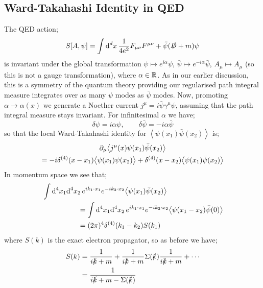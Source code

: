 \subsection{Ward-Takahashi Identity in QED}
The QED action;
\begin{equation*}
S[A, \psi] = \int{\text{d}^d x \,\frac{1}{4e^2}F_{\mu\nu}F^{\mu\nu} + \bar{\psi}(\slashed{D} + m)\psi}
\end{equation*}
is invariant under the global transformation $\psi \mapsto e^{i\alpha}\psi$, $\bar{\psi} \mapsto e^{-i\alpha}\bar{\psi}$, $A_\mu \mapsto A_\mu$ (so this is not a gauge transformation), where $\alpha \in \mathbb{R}$. As in our earlier discussion, this is a symmetry of the quantum theory providing our regularised path integral measure integrates over as many $\psi$ modes as $\bar{\psi}$ modes. Now, promoting $\alpha \rightarrow \alpha(x)$ we generate a Noether current $j^{\mu} = i \bar{\psi}\gamma^{\mu}\psi$, assuming that the path integral measure stays invariant. For infinitesimal $\alpha$ we have;
\begin{equation*}
\delta \psi = i \alpha \psi, \qquad \delta \bar{\psi} = -i \alpha \bar{\psi}
\end{equation*}
so that the local Ward-Takahashi identity for $\left< \psi(x_1)\bar{\psi}(x_2) \right>$ is;
\begin{multline*}
\del_\mu\left< j^{\mu}(x)\psi(x_1)\bar{\psi}(x_2) \right> \\ = -i\delta^{(4)}(x - x_1)\left< \psi(x_1)\bar{\psi}(x_2) \right> + \delta^{(4)}(x - x_2)\left< \psi(x_1)\bar{\psi}(x_2) \right>
\end{multline*}
In momentum space we see that;
\begin{align*}
&\int{\ud^4 x_1\upd{^4 x_2}e^{ik_1 \cdot x_1}e^{-ik_2\cdot x_2}\left< \psi(x_1)\bar{\psi}(x_2) \right>} \\
&\hspace{50pt}= \int{\ud^4 x_1 \upd{^4 x_2} e^{ik_1\cdot x_1}e^{-ik_2\cdot x_2}\left< \psi(x_1 - x_2)\bar{\psi}(0) \right>} \\
&\hspace{50pt}= (2\pi)^4 \delta^{(4)}(k_1 - k_2)S(k_1)
\end{align*}
where $S(k)$ is the exact electron propagator, so as before we have;
\begin{align*}
S(k) &= \frac{1}{i\slashed{k} + m} + \frac{1}{i\slashed{k} + m}\Sigma(\slashed{k}) \frac{1}{i\slashed{k} + m} + \cdots \\
&= \frac{1}{i\slashed{k} + m - \Sigma(\slashed{k})}
\end{align*}

